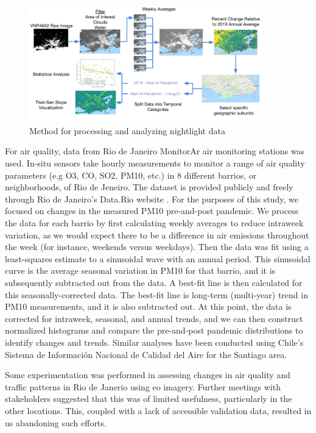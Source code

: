 \begin{figure}[h]
\centering
\includegraphics[width=0.9\textwidth]{Figures/chap5/nightlights_method.png}
\caption[Nightlights Processing Methodology]{Method for processing and analyzing nightlight data}
\label{fig:nightlights_method}
\end{figure}

For air quality, data from Rio de Janeiro MonitorAr air monitoring stations was used. In-situ sensors take hourly measurements to monitor a range of air quality parameters (e.g O3, CO, SO2, PM10, etc.) in 8 different barrios, or neighborhoods, of Rio de Jeneiro. The dataset is provided publicly and freely through Rio de Janeiro's Data.Rio website \cite{institutopereirapassosDataRio2017}. For the purposes of this study, we focused on changes in the measured PM10 pre-and-post pandemic. We process the data for each barrio by first calculating weekly averages to reduce intraweek variation, as we would expect there to be a difference in air emissions throughout the week (for instance, weekends versus weekdays). Then the data was fit using a least-squares estimate to a sinusoidal wave with an annual period. This sinusoidal curve is the average seasonal variation in PM10 for that barrio, and it is subsequently subtracted out from the data. A best-fit line is then calculated for this seasonally-corrected data. The best-fit line is long-term (multi-year) trend in PM10 measurements, and it is also subtracted out. At this point, the data is corrected for intraweek, seasonal, and annual trends, and we can then construct normalized histograms and compare the pre-and-post pandemic distributions to identify changes and trends. Similar analyses have been conducted using Chile's Sistema de Información Nacional de Calidad del Aire \cite{ministeriodecienciatecnologiaconocimientoeinnovacionDatosCOVID192021} for the Santiago area.

Some experimentation was performed in assessing changes in air quality and traffic patterns in Rio de Janerio using \ac{eo} imagery. Further meetings with stakeholders suggested that this was of limited usefulness, particularly in the other locations. This, coupled with a lack of accessible validation data, resulted in us abandoning such efforts.

